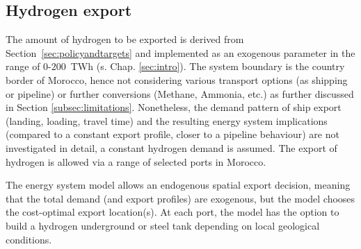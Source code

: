 \subsection{Hydrogen export}
\label{subsec:hydrogen_export}
The amount of hydrogen to be exported is derived from Section~\ref{sec:policyandtargets} and implemented as an exogenous parameter in the range of 0-200~TWh (s. Chap. \ref{sec:intro}). The system boundary is the country border of Morocco, hence not considering various transport options (as shipping or pipeline) or further conversions (Methane, Ammonia, etc.) as further discussed in Section \ref{subsec:limitations}. %
Nonetheless, the demand pattern of ship export (landing, loading, travel time) and the resulting energy system implications (compared to a constant export profile, closer to a pipeline behaviour) are not investigated in detail, a constant hydrogen demand is assumed. The export of hydrogen is allowed via a range of selected ports in Morocco.

The energy system model allows an endogenous spatial export decision, meaning that the total demand (and export profiles) are exogenous, but the model chooses the  cost-optimal export location(s). At each port, the model has the option to build a hydrogen underground or steel tank depending on local geological conditions.






